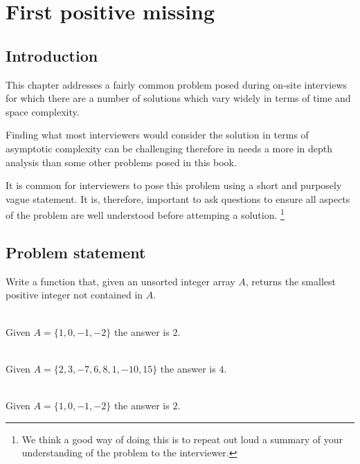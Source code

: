 %

\chapter{First positive missing}
\label{ch:first_positive_missing}
\section*{Introduction}

This chapter addresses a fairly common problem posed during on-site interviews for which there are a number of solutions which vary widely in terms of time and space complexity.

Finding what most interviewers would consider the  solution in terms of asymptotic complexity can be challenging therefore in needs a more in depth analysis than some other problems posed in this book.

It is common for interviewers to pose this problem using a short and purposely vague statement.
It is, therefore,  important to ask questions to ensure all aspects of the problem are well understood before attemping a solution.  \footnote{ We think a good way of doing this is to repeat out loud a summary of your understanding of the problem to the interviewer.}

\section{Problem statement}
\begin{exercise}
	Write a function that, given an unsorted integer array $A$, returns the smallest positive integer not contained in $A$.

	\begin{example}
		\hfill \\
		Given $A=\{ 1, 0, -1, -2\}$ the answer is $2$.
	\end{example}
	
	\begin{example}
		\hfill \\
		Given $A=\{ 2, 3, -7, 6, 8, 1, -10, 15\}$ the answer is $4$.
	\end{example}
	
	\begin{example}
		\hfill \\
		Given $A=\{ 1, 0, -1, -2\}$ the answer is $2$.
	\end{example}
\end{exercise}
	
